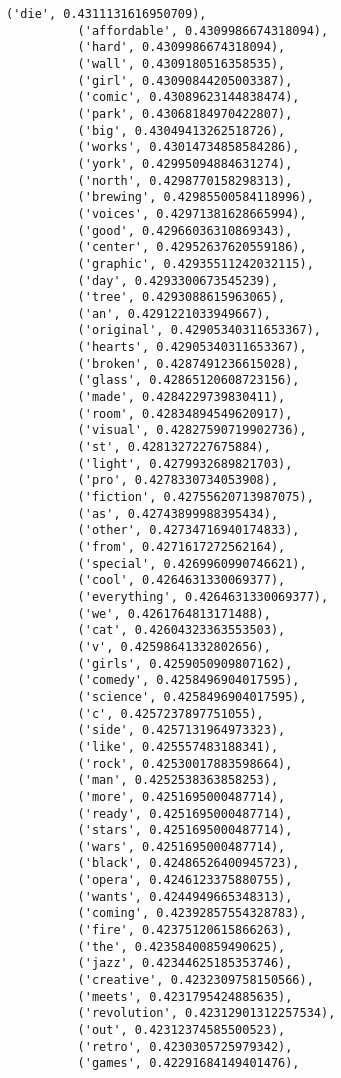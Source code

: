 \documentclass[11pt]{article}
\begin{document}
\begin{Verbatim}[commandchars=\\\{\}]
          ('die', 0.4311131616950709),
          ('affordable', 0.4309986674318094),
          ('hard', 0.4309986674318094),
          ('wall', 0.4309180516358535),
          ('girl', 0.43090844205003387),
          ('comic', 0.43089623144838474),
          ('park', 0.43068184970422807),
          ('big', 0.43049413262518726),
          ('works', 0.43014734858584286),
          ('york', 0.42995094884631274),
          ('north', 0.4298770158298313),
          ('brewing', 0.42985500584118996),
          ('voices', 0.42971381628665994),
          ('good', 0.42966036310869343),
          ('center', 0.42952637620559186),
          ('graphic', 0.42935511242032115),
          ('day', 0.4293300673545239),
          ('tree', 0.4293088615963065),
          ('an', 0.4291221033949667),
          ('original', 0.42905340311653367),
          ('hearts', 0.42905340311653367),
          ('broken', 0.4287491236615028),
          ('glass', 0.42865120608723156),
          ('made', 0.4284229739830411),
          ('room', 0.42834894549620917),
          ('visual', 0.42827590719902736),
          ('st', 0.4281327227675884),
          ('light', 0.4279932689821703),
          ('pro', 0.4278330734053908),
          ('fiction', 0.42755620713987075),
          ('as', 0.42743899988395434),
          ('other', 0.42734716940174833),
          ('from', 0.4271617272562164),
          ('special', 0.4269960990746621),
          ('cool', 0.4264631330069377),
          ('everything', 0.4264631330069377),
          ('we', 0.4261764813171488),
          ('cat', 0.42604323363553503),
          ('v', 0.42598641332802656),
          ('girls', 0.4259050909807162),
          ('comedy', 0.4258496904017595),
          ('science', 0.4258496904017595),
          ('c', 0.4257237897751055),
          ('side', 0.4257131964973323),
          ('like', 0.425557483188341),
          ('rock', 0.42530017883598664),
          ('man', 0.4252538363858253),
          ('more', 0.4251695000487714),
          ('ready', 0.4251695000487714),
          ('stars', 0.4251695000487714),
          ('wars', 0.4251695000487714),
          ('black', 0.42486526400945723),
          ('opera', 0.4246123375880755),
          ('wants', 0.4244949665348313),
          ('coming', 0.42392857554328783),
          ('fire', 0.42375120615866263),
          ('the', 0.42358400859490625),
          ('jazz', 0.42344625185353746),
          ('creative', 0.4232309758150566),
          ('meets', 0.4231795424885635),
          ('revolution', 0.42312901312257534),
          ('out', 0.42312374585500523),
          ('retro', 0.4230305725979342),
          ('games', 0.42291684149401476),

\end{Verbatim}
\end{document}
